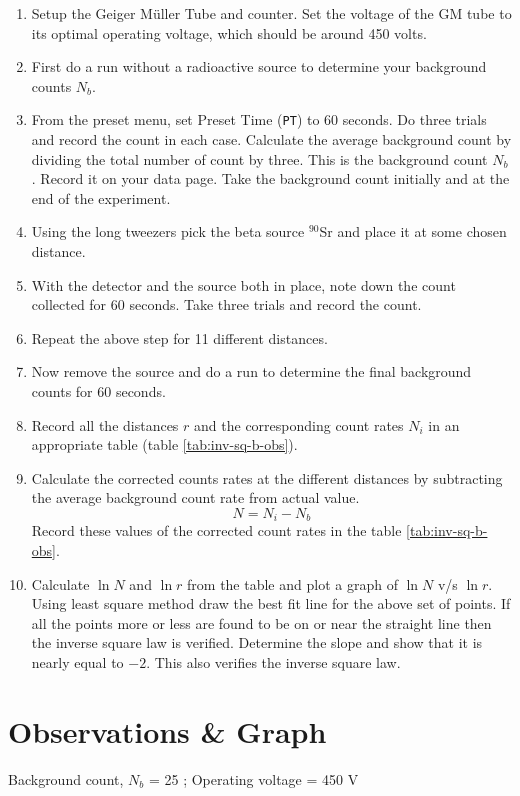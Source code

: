 	\begin{enumerate}
		\item 	 Setup the Geiger M{\"u}ller Tube and counter. Set the voltage of the GM tube to its optimal operating voltage, which should be around 450 volts.
		\item 	 First do a run without a radioactive source to determine your background counts $ N_b $.
		\item 	 From the preset menu, set Preset Time (\texttt{PT}) to 60 seconds. Do three trials and record the count in each case. Calculate the average background count by dividing the total number of count by three. This is the background count $ N_b $. Record it on your data page. Take the background count initially and at the end of the experiment.
		\item  	Using the long tweezers pick the beta source $ ^{90} $Sr and place it at some chosen distance.
		\item 	With the detector and the source both in place, note down the count collected for 60 seconds. Take three trials and record the count.
		\item  Repeat the above step for 11 different distances.
		\item 	Now remove the source and do a run to determine the final background counts for 60 seconds.
		\item 	Record all the distances $ r $ and the corresponding count rates $ N_i $ in an appropriate table (table \ref{tab:inv-sq-b-obs}).
		\item 	Calculate the corrected counts rates at the different distances by subtracting the average background count rate from actual value. 
		\begin{equation}\label{eqn:background-count}
			N = N_i - N_b
		\end{equation}
		Record these values of the corrected count rates in the table \ref{tab:inv-sq-b-obs}.
		\item 	Calculate $ \ln N $ and $ \ln r $ from the table and plot a graph of $ \ln N $ v/s $ \ln r $. Using least square method draw the best fit line for the above set of points. If all the points more or less are found to be on or near the straight line then the inverse square law is verified. Determine the slope and show that it is nearly equal to $ -2 $. This also verifies the inverse square law.
		
	\end{enumerate}
	
\section{Observations \& Graph}
	Background count, $N_b$ = 25 ; Operating voltage = 450 V\\
	
